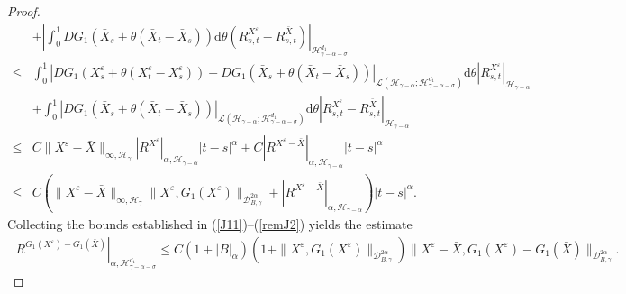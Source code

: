 \documentclass[10pt,a4paper]{amsart}
\begin{document}
\begin{proof}
\begin{align}
		&+\left|\int_0^1 DG_1(\bar{X}_s+\theta (\bar{X}_t-\bar{X}_s)) \mathrm{d} \theta \left(R_{s,t}^{X^\varepsilon}-R_{s,t}^{\bar{X}} \right) \right|_{\mathcal H_{\gamma-\alpha-\sigma}^{d_1} } \nonumber\\
		\leq & \int_0^1 | DG_1(X_s^\varepsilon+\theta (X_t^\varepsilon-X_s^\varepsilon))-DG_1(\bar{X}_s+\theta (\bar{X}_t-\bar{X}_s)) |_{\mathcal L(\mathcal H_{\gamma-\alpha}; \mathcal H_{\gamma-\alpha-\sigma}^{d_1} )} \mathrm{d} \theta \left|R_{s,t}^{X^\varepsilon} \right|_{\mathcal H_{\gamma-\alpha}}  \nonumber\\
		&+\int_0^1 | DG_1(\bar{X}_s+\theta (\bar{X}_t-\bar{X}_s)) |_{\mathcal L(\mathcal H_{\gamma-\alpha}; \mathcal H_{\gamma-\alpha-\sigma}^{d_1} )}  \mathrm{d} \theta \left|R_{s,t}^{X^\varepsilon}-R_{s,t}^{\bar{X}} \right|_{\mathcal H_{\gamma-\alpha}} \nonumber\\
		\leq & C \|X^\varepsilon-\bar{X}\|_{\infty, \mathcal H_{\gamma}}  |R^{X^\varepsilon}|_{\alpha, \mathcal H_{\gamma-\alpha}} |t-s|^\alpha
		+C |R^{X^\varepsilon-\bar{X}} |_{\alpha, \mathcal H_{\gamma-\alpha}} |t-s|^\alpha \nonumber\\
		\leq & C \left(\|X^\varepsilon-\bar{X}\|_{\infty, \mathcal H_{\gamma}}
		\|X^\varepsilon, G_1(X^\varepsilon)\|_{\mathcal{D}_{ B,\gamma}^{2\alpha}} + |R^{X^\varepsilon-\bar{X}} |_{\alpha, \mathcal H_{\gamma-\alpha}} \right) |t-s|^\alpha .
	\end{align}
	Collecting the bounds established in (\ref{J11})--(\ref{remJ2}) yields the estimate
	\begin{align}\label{G1rem1}
		|R^{G_1(X^\varepsilon)-G_1(\bar{X})} |_{\alpha, \mathcal H_{\gamma-\alpha-\sigma}^{d_1}} \leq C (1+|B|_\alpha) (1+\|X^\varepsilon, G_1(X^\varepsilon)\|_{\mathcal{D}_{ B,\gamma}^{2\alpha}} ) \|X^\varepsilon-\bar{X},G_1(X^\varepsilon)-G_1(\bar{X})\|_{\mathcal{D}_{ B,\gamma}^{2\alpha}}.
	\end{align}
	
	
	

\end{proof}
\end{document}
